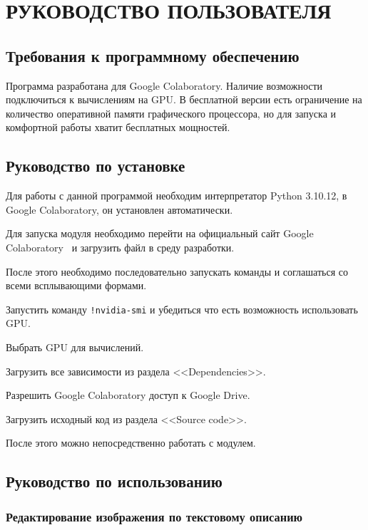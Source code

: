 \section{РУКОВОДСТВО ПОЛЬЗОВАТЕЛЯ}
\label{sec:manual}

\subsection{Требования к программному обеспечению}

Программа разработана для Google Colaboratory. Наличие возможности подключиться к вычислениям на GPU. В бесплатной версии есть ограничение на количество оперативной памяти графического процессора, но для запуска и комфортной работы хватит бесплатных мощностей.

\subsection{Руководство по установке}

Для работы с данной программой необходим интерпретатор Python 3.10.12, в Google Colaboratory, он установлен автоматически.

Для запуска модуля необходимо перейти на официальный сайт Google Colaboratory~\cite{colab} и загрузить файл в среду разработки.

После этого необходимо последовательно запускать команды и соглашаться со всеми всплывающими формами.

\begin{enumerate_num}
    \item Запустить команду \lstinline{!nvidia-smi} и убедиться что есть возможность использовать GPU.
    \item Выбрать GPU для вычислений.
    \item Загрузить все зависимости из раздела <<Dependencies>>.
    \item Разрешить Google Colaboratory доступ к Google Drive.
    \item Загрузить исходный код из раздела <<Source code>>.
\end{enumerate_num}

После этого можно непосредственно работать с модулем.

\subsection{Руководство по использованию}

\subsubsection{Редактирование изображения по текстовому описанию}

